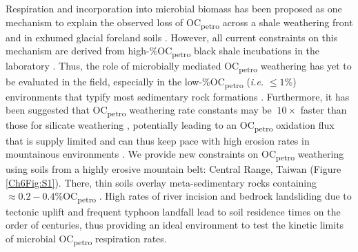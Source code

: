 Respiration and incorporation into microbial biomass has been proposed as one mechanism to explain the observed loss of OC\textsubscript{petro} across a shale weathering front \citep{Petsch:2001eq,Petsch:2005gd,Schillawski:2008ko,Petsch:2014ct} and in exhumed glacial foreland soils \citep{Bardgett:2007eb}. However, all current constraints on this mechanism are derived from high-\%OC\textsubscript{petro} black shale incubations in the laboratory \citep{Petsch:2001eq,Schillawski:2008ko}. Thus, the role of microbially mediated OC\textsubscript{petro} weathering has yet to be evaluated in the field, especially in the low-\%OC\textsubscript{petro} (\textit{i.e.} $\leq 1$\%) environments that typify most sedimentary rock formations \citep{Copard:2007bf}. Furthermore, it has been suggested that OC\textsubscript{petro} weathering rate constants may be $~10\times$ faster than those for silicate weathering \citep{Chang:1999vo}, potentially leading to an OC\textsubscript{petro} oxidation flux that is supply limited and can thus keep pace with high erosion rates in mountainous environments \citep{Hilton:2014dh}. We provide new constraints on OC\textsubscript{petro} weathering using soils from a highly erosive mountain belt: Central Range, Taiwan (Figure \ref{Ch6Fig:S1}). There, thin soils \citep[$\leq 0.8$ m;][]{Tsai:2001vp} overlay meta-sedimentary rocks containing $\approx 0.2 - 0.4$\%OC\textsubscript{petro} \citep[Supplementary Discussion \ref{Ch6SD1};][]{Hilton:2010cg}. High rates of river incision and bedrock landsliding due to tectonic uplift and frequent typhoon landfall lead to soil residence times on the order of centuries, thus providing an ideal environment to test the kinetic limits of microbial OC\textsubscript{petro} respiration rates.

